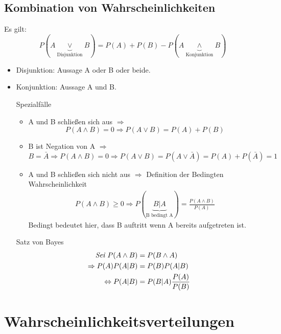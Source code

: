 \documentclass[10pt,a4paper]{article}
\begin{document}
\subsection{Kombination von Wahrscheinlichkeiten}
Es gilt:
\begin{equation}P(A \underbrace{\lor}_{ \text{Disjunktion}} B)=P(A) + P(B) -P(A \underbrace{\land}_{\text{Konjunktion}} B)  
\end{equation} 
\begin{itemize}
\item Disjunktion: Aussage A oder B oder beide.
\item Konjunktion: Aussage A und B.
\item[Spezialfälle]
\begin{itemize}
\item A und B schließen sich aus $\Rightarrow$ 
\begin{equation}
P(A \land B) = 0 \Rightarrow P(A \lor B)= P(A) + P(B)
\end{equation}
\item B ist Negation von A $\Rightarrow$ 
\begin{equation}
B= \bar{A} \Rightarrow P(A \land B)= 0 \Rightarrow P(A \lor B) = P(A \lor \bar{A}) = P(A) + P(\bar{A}) = 1 
\end{equation}
\item A und B schließen sich nicht aus $\Rightarrow$ Definition der Bedingten Wahrscheinlichkeit
\begin{align}
P(A \land B) \ge 0 \Rightarrow P(\underbrace{B|A}_{ \text{B bedingt A}})= \frac{P(A \land B)}{P(A)} 
\end{align}
Bedingt bedeutet hier, dass B auftritt wenn A bereits aufgetreten ist. 
\end{itemize}
\item[Satz von Bayes]
\begin{align}
\textit{Sei } P(A \land B) &= P(B \land A) \notag \\
 \Rightarrow P(A)P(A|B)&=P(B)P(A|B) \notag \\
\Leftrightarrow P(A|B)&=P(B|A)\frac{P(A)}{P(B)}
\end{align}
\end{itemize}

\section{Wahrscheinlichkeitsverteilungen}
\end{document}
